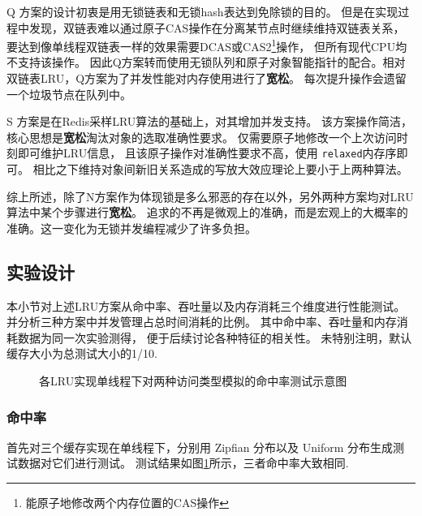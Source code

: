 Q 方案的设计初衷是用无锁链表和无锁hash表达到免除锁的目的。
但是在实现过程中发现，双链表难以通过原子CAS操作在分离某节点时继续维持双链表关系，
要达到像单线程双链表一样的效果需要DCAS或CAS2\footnote{能原子地修改两个内存位置的CAS操作}操作，
但所有现代CPU均不支持该操作。
因此Q方案转而使用无锁队列和原子对象智能指针的配合。相对双链表LRU，Q方案为了并发性能对内存使用进行了\textbf{宽松}。
每次提升操作会遗留一个垃圾节点在队列中。

S 方案是在Redis采样LRU算法的基础上，对其增加并发支持。
该方案操作简洁，核心思想是\textbf{宽松}淘汰对象的选取准确性要求。
仅需要原子地修改一个上次访问时刻即可维护LRU信息，
且该原子操作对准确性要求不高，使用 \verb|relaxed|内存序即可。
相比之下维持对象间新旧关系造成的写放大效应理论上要小于上两种算法。

综上所述，除了N方案作为体现锁是多么邪恶的存在以外，另外两种方案均对LRU算法中某个步骤进行\textbf{宽松}。
追求的不再是微观上的准确，而是宏观上的大概率的准确。这一变化为无锁并发编程减少了许多负担。

\subsection{实验设计}

本小节对上述LRU方案从命中率、吞吐量以及内存消耗三个维度进行性能测试。
并分析三种方案中并发管理占总时间消耗的比例。
其中命中率、吞吐量和内存消耗数据为同一次实验测得，
便于后续讨论各种特征的相关性。
未特别注明，默认缓存大小为总测试大小的1/10.

\begin{figure}
    \caption{各LRU实现单线程下对两种访问类型模拟的命中率测试示意图}
    \label{fig:dist_on_3_1thread}
\end{figure}

\subsubsection{命中率}

首先对三个缓存实现在单线程下，分别用 Zipfian 分布以及 Uniform 分布生成测试数据对它们进行测试。
测试结果如图\ref{fig:dist_on_3_1thread}所示，三者命中率大致相同.





